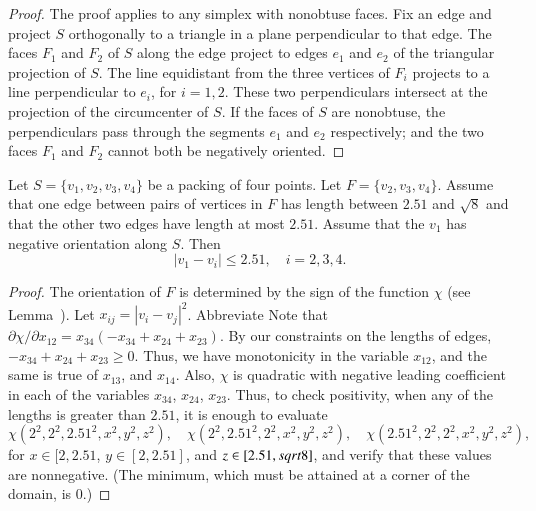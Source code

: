 \begin{tarskidata}
\begin{tarski}
\begin{proof}
The proof applies to any simplex with nonobtuse faces. 
Fix an edge and project $S$ orthogonally
to a triangle in a plane perpendicular to that edge. The faces
$F_1$ and $F_2$ of $S$ along the edge project to edges $e_1$ and
$e_2$ of the triangular projection of $S$. The line equidistant
from the three vertices of $F_i$ projects to a line perpendicular
to $e_i$, for $i=1,2$. These two perpendiculars intersect at the
projection of the circumcenter of $S$.  If the faces of $S$ are
nonobtuse, the perpendiculars pass through the segments $e_1$ and
$e_2$ respectively; and the two faces $F_1$ and $F_2$ cannot both
be negatively oriented.
\end{proof}
\end{tarski}





\begin{tarski}

\begin{lemma}
Let $S=\{v_1,v_2,v_3,v_4\}$ be a packing of four points.
Let $F=\{v_2,v_3,v_4\}$.
Assume that one edge between
pairs of vertices in $F$
has length between $2.51$ and $\sqrt8$ and that
the other two edges have length at most $2.51$.  
Assume that the $v_1$ has negative orientation
along $S$. Then
   $$
   |v_1-v_i|\le 2.51, \quad i=2,3,4.
   $$
\end{lemma}

\begin{proof}  
The orientation of $F$ is determined by the sign of the function
$\chi$ (see Lemma~). 
Let $x_{ij}=|v_i-v_j|^2$.  Abbreviate
Note that $\partial\chi/\partial x_{12} = x_{34}
(-x_{34}+x_{24}+x_{23})$.  By our
constraints on the lengths of edges, 
$-x_{34}+x_{24}+x_{23}\ge0$. Thus, we have monotonicity in the variable $x_{12}$,
and the same is true of $x_{13}$, and $x_{14}$. Also, $\chi$ is
quadratic with negative leading coefficient in each of the
variables $x_{34}$, $x_{24}$, $x_{23}$. Thus, to check positivity, when any
of the lengths is greater than $2.51$, it is enough to evaluate
$$\chi(2^2,2^2,2.51^2,x^2,y^2,z^2), \quad
\chi(2^2,2.51^2,2^2,x^2,y^2,z^2),  \quad
\chi(2.51^2,2^2,2^2,x^2,y^2,z^2),$$ for $x\in[2,2.51$,
$y\in[2,2.51]$, and $z\in[2.51,sqrt8]$, and verify that these
values are nonnegative. (The minimum, which must be attained at a
corner of the domain, is  $0$.)
\end{proof}
\end{tarski}





\end{tarskidata}
